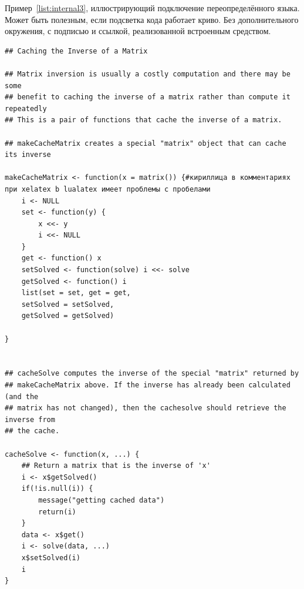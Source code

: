 %


Пример~\ref{list:internal3}, иллюстрирующий подключение переопределённого языка. Может быть полезным, если подсветка кода работает криво. Без дополнительного окружения, с подписью и ссылкой, реализованной встроенным средством.
\begin{lstlisting}[language={Renhanced},caption={Пример листинга c подписью собственными средствами},label={list:internal3}]
## Caching the Inverse of a Matrix

## Matrix inversion is usually a costly computation and there may be some
## benefit to caching the inverse of a matrix rather than compute it repeatedly
## This is a pair of functions that cache the inverse of a matrix.

## makeCacheMatrix creates a special "matrix" object that can cache its inverse

makeCacheMatrix <- function(x = matrix()) {#кириллица в комментариях при xelatex b lualatex имеет проблемы с пробелами
    i <- NULL
    set <- function(y) {
        x <<- y
        i <<- NULL
    }
    get <- function() x
    setSolved <- function(solve) i <<- solve
    getSolved <- function() i
    list(set = set, get = get,
    setSolved = setSolved,
    getSolved = getSolved)
    
}


## cacheSolve computes the inverse of the special "matrix" returned by
## makeCacheMatrix above. If the inverse has already been calculated (and the
## matrix has not changed), then the cachesolve should retrieve the inverse from
## the cache.

cacheSolve <- function(x, ...) {
    ## Return a matrix that is the inverse of 'x'
    i <- x$getSolved()
    if(!is.null(i)) {
        message("getting cached data")
        return(i)
    }
    data <- x$get()
    i <- solve(data, ...)
    x$setSolved(i)
    i  
}
\end{lstlisting}
%
%    





